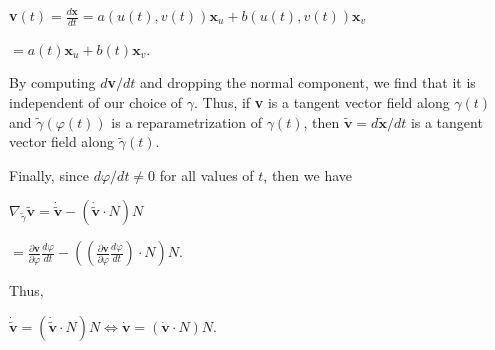 \documentclass[12pt, a4paper]{article}
\begin{document}
\vspace{4mm}

\centerline{\textbf{v}$(t)=\frac{d\bm{x}}{dt}=a(u(t),v(t))\bm{x}_u+b(u(t),v(t))\bm{x}_v$}
\vspace{2mm}
\hspace{52.5mm}$=a(t)\bm{x}_u+b(t)\bm{x}_v$.\par

\vspace{4mm}

By computing $d$\textbf{v}$/dt$ and dropping the normal component, we find that it is independent of our choice of $\gamma$. Thus, if \textbf{v} is a tangent vector field along $\gamma(t)$ and $\tilde{\gamma}(\varphi(t))$ is a reparametrization of $\gamma(t)$, then $\tilde{\textbf{v}}=d\tilde{\bm{x}}/dt$ is a tangent vector field along $\tilde{\gamma}(t)$.\par

\vspace{4mm}

Finally, since $d\varphi/dt\neq 0$ for all values of $t$, then we have 
\par

\vspace{4mm}

\centerline{$\nabla_{\tilde{\gamma}}\tilde{\textbf{v}}=\dot{\tilde{\textbf{v}}}-(\dot{\tilde{\textbf{v}}}\cdot N)N$}
\vspace{2mm}
\centerline{$=\frac{\partial \textbf{v}}{\partial \varphi}\frac{d\varphi}{dt}-((\frac{\partial \textbf{v}}{\partial \varphi}\frac{d\varphi}{dt})\cdot N)N$.}

\vspace{4mm}

Thus,\par

\vspace{4mm}

\centerline{$\dot{\tilde{\textbf{v}}}=(\dot{\tilde{\textbf{v}}}\cdot N)N\Leftrightarrow \dot{\textbf{v}}=(\dot{\textbf{v}}\cdot N)N$.}
\end{document}
